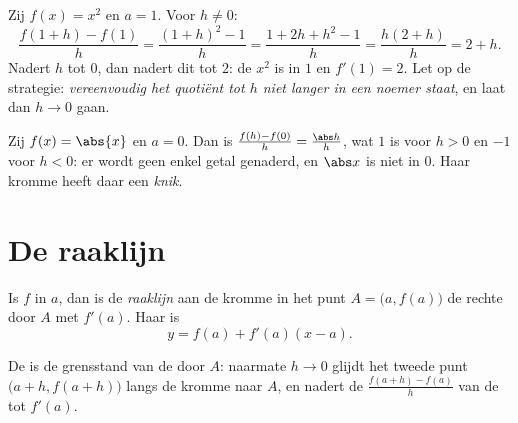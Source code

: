 \begin{example}\label{ex:g11:deriv:atpoint}
Zij $f(x) = x^2$ en $a = 1$. Voor $h \neq 0$:
\[
\frac{f(1+h) - f(1)}{h}
= \frac{(1+h)^2 - 1}{h}
= \frac{1 + 2h + h^2 - 1}{h}
= \frac{h(2 + h)}{h}
= 2 + h .
\]
Nadert $h$ tot $0$, dan nadert dit tot $2$: de  $x^2$ is
 in $1$ en $f'(1) = 2$. Let op de strategie:
\emph{vereenvoudig het quotiënt tot $h$ niet langer in een noemer staat}, en
laat dan $h \to 0$ gaan.
\end{example}

\begin{example}
Zij $f(x) = \abs{x}$ en $a = 0$. Dan is
$\frac{f(h) - f(0)}{h} = \frac{\abs h}{h}$, wat $1$ is voor $h > 0$ en $-1$
voor $h < 0$: er wordt geen enkel getal genaderd, en $\abs x$ is niet
 in $0$. Haar kromme heeft daar een \emph{knik}.
\end{example}

\section{De raaklijn}

\begin{definition}[Raaklijn]\label{def:g11:deriv:tangent}
Is $f$  in $a$, dan is de \emph{raaklijn}
aan de kromme in het punt $A = \bigl(a, f(a)\bigr)$ de rechte door $A$ met
 $f'(a)$. Haar  is
\[
y = f(a) + f'(a)(x - a).
\]
\end{definition}

De  is de grensstand van de  door $A$: naarmate $h \to 0$
glijdt het tweede punt $\bigl(a+h, f(a+h)\bigr)$ langs de kromme naar $A$, en
nadert de  $\frac{f(a+h)-f(a)}{h}$ van de  tot
$f'(a)$.

